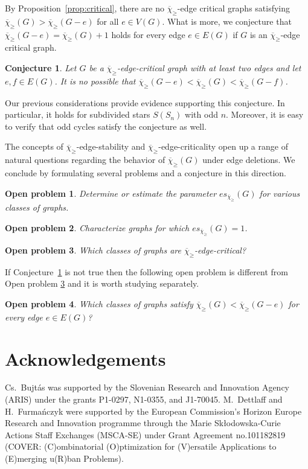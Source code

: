 \documentclass{article}
\newtheorem{open}{Open problem}
\newtheorem{conj}{Conjecture}
\theoremstyle{definition}
\newcommand{\mc}{\overline{\chi}_{\geqslant}}
\newcommand{\cg}{{\rm C}_{\geqslant}}
\begin{document}
By Proposition~\ref{prop:critical}, there are no $\mc$-edge critical graphs satisfying $\mc(G) > \mc(G-e)$ for all $e\in V(G)$. What is more, we conjecture that $\mc(G-e) = \mc(G)+1$ holds for every edge $e \in E(G)$ if $G$ is an $\mc$-edge critical graph.

\begin{conj}\label{conj:criticality}
    Let $G$ be a $\mc$-edge-critical graph with at least two edges and let $e,f \in E(G)$. It is no possible that $\mc(G-e) < \mc(G) < \mc(G-f)$. 
\end{conj}

Our previous considerations provide evidence supporting this conjecture. In particular, it holds for subdivided stars $S(S_n)$ with odd $n$. Moreover, it is easy to verify that odd cycles satisfy the conjecture as well.
\bigskip

The concepts of $\mc$-edge-stability and $\mc$-edge-criticality open up a range of natural questions regarding the behavior of $\mc(G)$ under edge deletions. We conclude by formulating several problems and a conjecture in this direction.

\begin{open}
Determine or estimate the parameter $es_{\mc}(G)$ for various classes of graphs.
\end{open}

\begin{open}
Characterize graphs for which $es_{\mc}(G)=1$.
\end{open}

\begin{open}
    Which classes of graphs are $\mc$-edge-critical?\label{open:crit}
\end{open}

If Conjecture~\ref{conj:criticality} is not true then the following open problem is different from Open problem \ref{open:crit} and it is worth studying separately.

\begin{open}
    Which classes of graphs satisfy $\mc(G) < \mc(G-e)$ for every edge $e\in E(G)$?
\end{open}


\section*{Acknowledgements}
Cs.\ Bujt\'as was supported by the Slovenian Research and Innovation Agency (ARIS) under the grants P1-0297, N1-0355, and J1-70045. 
M.\ Dettlaff and H.\ Furma\'nczyk were supported by the European Commission's Horizon Europe Research and Innovation programme through the Marie Skłodowska-Curie Actions Staff Exchanges (MSCA-SE) under Grant Agreement no.101182819 (COVER: (C)ombinatorial (O)ptimization for (V)ersatile Applications to (E)merging u(R)ban Problems).
\end{document}
